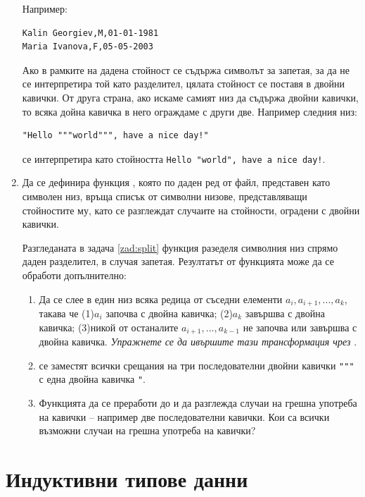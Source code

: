 \begin{enumerate}[]
\begin{mdframed}[hidealllines=true,backgroundcolor=gray!20]
Например:
\begin{verbatim}
Kalin Georgiev,M,01-01-1981
Maria Ivanova,F,05-05-2003
\end{verbatim}

Ако в рамките на дадена стойност се съдържа символът за запетая, за да не се интерпретира той като разделител, цялата стойност се поставя в двойни кавички. От друга страна, ако искаме самият низ да съдържа двойни кавички, то всяка дойна кавичка в него ограждаме с други две. Например следния низ:
\begin{verbatim}
"Hello """world""", have a nice day!"
\end{verbatim}
се интерпретира като стойността \verb#Hello "world", have a nice day!#.

\end{mdframed}

\item Да се дефинира функция , която по даден ред от  файл, представен като символен низ, връща списък от символни низове, представляващи стойностите му, като се разглеждат случаите на стойности, оградени с двойни кавички.

Разгледаната в задача \ref{zad:split} функция  разеделя символния низ спрямо даден разделител, в случая запетая. Резултатът от функцията може да се обработи допълнително:
\begin{enumerate}[label=\alph*)]
	\item Да се слее в един низ всяка редица от съседни елементи $a_i,a_{i+1},...,a_k$, такава че (1)$a_i$ започва с двойна кавичка;  (2)$a_k$ завършва с двойна кавичка; (3)никой от останалите $a_{i+1},...,a_{k-1}$ не започва или завършва с двойна кавичка. \emph{Упражнете се да ивършите тази трансформация чрез }.
	\item се заместят всички срещания на три последователни двойни кавички \verb#"""# с една двойна кавичка \verb#"#.
	\item Функцията да се преработи до  и да разглежда случаи на грешна употреба на кавички -- например две последователни кавички. Кои са всички възможни случаи на грешна употреба на кавички?
\end{enumerate}

\end{enumerate}


\section {Индуктивни типове данни}



